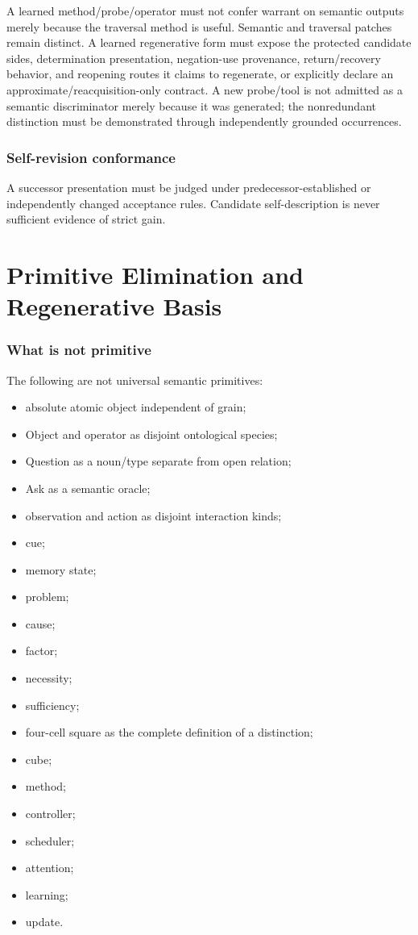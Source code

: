 \documentclass[11pt,oneside]{article}
\begin{document}
A learned method/probe/operator must not confer warrant on semantic outputs merely because the traversal method is useful.  Semantic and traversal patches remain distinct.  A learned regenerative form must expose the protected candidate sides, determination presentation, negation-use provenance, return/recovery behavior, and reopening routes it claims to regenerate, or explicitly declare an approximate/reacquisition-only contract.  A new probe/tool is not admitted as a semantic discriminator merely because it was generated; the nonredundant distinction must be demonstrated through independently grounded occurrences.

\section{Self-revision conformance}

A successor presentation must be judged under predecessor-established or independently changed acceptance rules.  Candidate self-description is never sufficient evidence of strict gain.

\part{Primitive Elimination and Regenerative Basis}

\section{What is not primitive}

The following are not universal semantic primitives:
\begin{itemize}
\item absolute atomic object independent of grain;
\item Object and operator as disjoint ontological species;
\item Question as a noun/type separate from open relation;
\item Ask as a semantic oracle;
\item observation and action as disjoint interaction kinds;
\item cue;
\item memory state;
\item problem;
\item cause;
\item factor;
\item necessity;
\item sufficiency;
\item four-cell square as the complete definition of a distinction;
\item cube;
\item method;
\item controller;
\item scheduler;
\item attention;
\item learning;
\item update.
\end{itemize}
\end{document}
